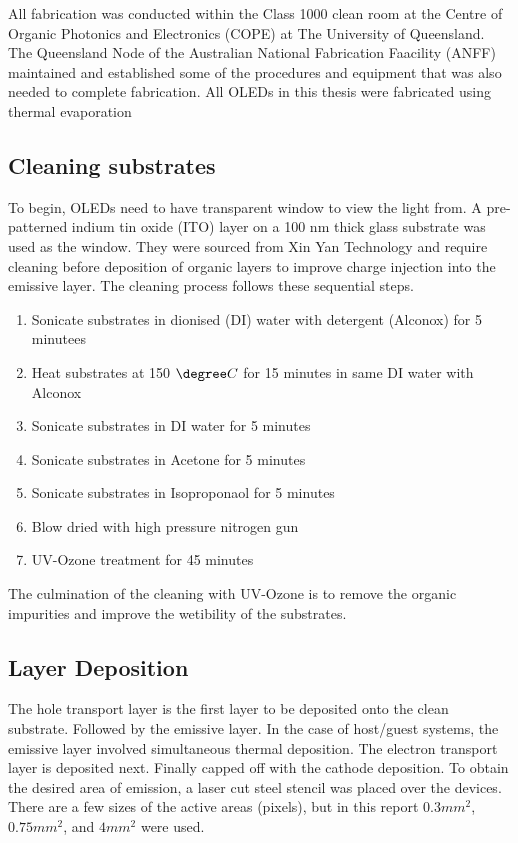 \documentclass[
  letterpaper,
  DIV=11,
  numbers=noendperiod,
  oneside]{scrreprt}
\begin{document}
All fabrication was conducted within the Class 1000 clean room at the
Centre of Organic Photonics and Electronics (COPE) at The University of
Queensland. The Queensland Node of the Australian National Fabrication
Faacility (ANFF) maintained and established some of the procedures and
equipment that was also needed to complete fabrication. All OLEDs in
this thesis were fabricated using thermal evaporation

\hypertarget{cleaning-substrates}{%
\subsection{Cleaning substrates}\label{cleaning-substrates}}

To begin, OLEDs need to have transparent window to view the light from.
A pre-patterned indium tin oxide (ITO) layer on a 100 nm thick glass
substrate was used as the window. They were sourced from Xin Yan
Technology and require cleaning before deposition of organic layers to
improve charge injection into the emissive layer. The cleaning process
follows these sequential steps.

\begin{enumerate}
\def\labelenumi{\arabic{enumi}.}
\item
  Sonicate substrates in dionised (DI) water with detergent (Alconox)
  for 5 minutees
\item
  Heat substrates at 150 \(\degree C\) for 15 minutes in same DI water
  with Alconox
\item
  Sonicate substrates in DI water for 5 minutes
\item
  Sonicate substrates in Acetone for 5 minutes
\item
  Sonicate substrates in Isoproponaol for 5 minutes
\item
  Blow dried with high pressure nitrogen gun
\item
  UV-Ozone treatment for 45 minutes
\end{enumerate}

The culmination of the cleaning with UV-Ozone is to remove the organic
impurities and improve the wetibility of the substrates.

\hypertarget{layer-deposition}{%
\subsection{Layer Deposition}\label{layer-deposition}}

The hole transport layer is the first layer to be deposited onto the
clean substrate. Followed by the emissive layer. In the case of
host/guest systems, the emissive layer involved simultaneous thermal
deposition. The electron transport layer is deposited next. Finally
capped off with the cathode deposition. To obtain the desired area of
emission, a laser cut steel stencil was placed over the devices. There
are a few sizes of the active areas (pixels), but in this report
\(0.3 mm^2\), \(0.75 mm^2\), and \(4 mm^2\) were used.
\end{document}

